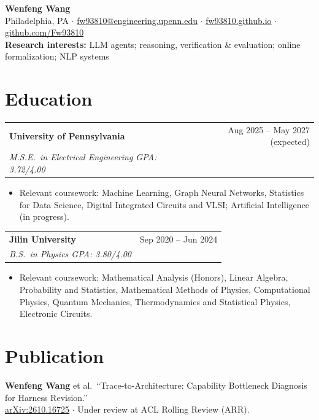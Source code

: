 \documentclass[10pt]{article}
\makeatletter
\newcommand{\entry}[4]{%
  \begin{tabularx}{\linewidth}{@{}X r@{}}
    \textbf{#1} & #2 \\
    \textit{#3} & \textit{#4} \\
  \end{tabularx}\vspace{-0.2ex}}
\makeatother
\begin{document}
\begin{center}
  {\LARGE\bfseries Wenfeng Wang}\\[0.6ex]
  Philadelphia, PA \;$\cdot$\; \href{mailto:fw93810@engineering.upenn.edu}{fw93810@engineering.upenn.edu} \;$\cdot$\; \href{https://fw93810.github.io}{fw93810.github.io} \;$\cdot$\; \href{https://github.com/Fw93810}{github.com/Fw93810}\\[0.5ex]
  {\small\textbf{Research interests:} LLM agents; reasoning, verification \& evaluation; online formalization; NLP systems}
\end{center}
\vspace{-1ex}

\section{Education}
\entry{University of Pennsylvania}{Aug 2025 -- May 2027 (expected)}{M.S.E.\ in Electrical Engineering \quad GPA: 3.72/4.00}{}
\begin{itemize}
  \item Relevant coursework: Machine Learning, Graph Neural Networks, Statistics for Data Science, Digital Integrated Circuits and VLSI; Artificial Intelligence (in progress).
\end{itemize}
\vspace{0.4ex}
\entry{Jilin University}{Sep 2020 -- Jun 2024}{B.S.\ in Physics \quad GPA: 3.80/4.00}{}
\begin{itemize}
  \item Relevant coursework: Mathematical Analysis (Honors), Linear Algebra, Probability and Statistics, Mathematical Methods of Physics, Computational Physics, Quantum Mechanics, Thermodynamics and Statistical Physics, Electronic Circuits.
\end{itemize}

\section{Publication}
\textbf{Wenfeng Wang} et al.\ ``Trace-to-Architecture: Capability Bottleneck Diagnosis for Harness Revision.''\\
\href{https://arxiv.org/abs/2610.16725}{\underline{arXiv:2610.16725}} \;$\cdot$\; Under review at ACL Rolling Review (ARR).
\end{document}
